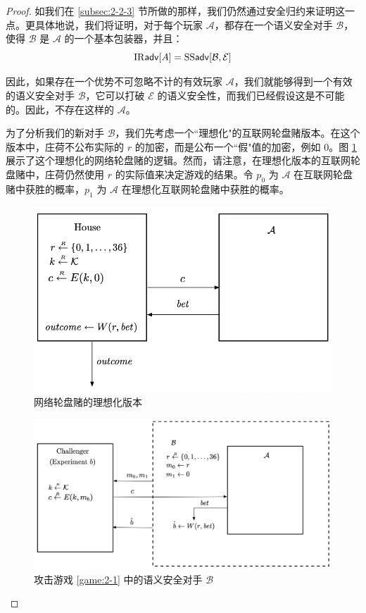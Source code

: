 \begin{proof}
如我们在 \ref{subsec:2-2-3} 节所做的那样，我们仍然通过安全归约来证明这一点。更具体地说，我们将证明，对于每个玩家 $\mathcal{A}$，都存在一个语义安全对手 $\mathcal{B}$，使得 $\mathcal{B}$ 是 $\mathcal{A}$ 的一个基本包装器，并且：
\begin{equation}\label{eq:2-7}
{\rm IR\mathsf{adv}}[A]={\rm SS\mathsf{adv}}[\mathcal{B},\mathcal{E}]
\end{equation}

因此，如果存在一个优势不可忽略不计的有效玩家 $\mathcal{A}$，我们就能够得到一个有效的语义安全对手 $\mathcal{B}$，它可以打破 $\mathcal{E}$ 的语义安全性，而我们已经假设这是不可能的。因此，不存在这样的 $\mathcal{A}$。

为了分析我们的新对手 $\mathcal{B}$，我们先考虑一个``理想化"的互联网轮盘赌版本。在这个版本中，庄荷不公布实际的 $r$ 的加密，而是公布一个``假"值的加密，例如 $0$。图 \ref{fig:2-3} 展示了这个理想化的网络轮盘赌的逻辑。然而，请注意，在理想化版本的互联网轮盘赌中，庄荷仍然使用 $r$ 的实际值来决定游戏的结果。令 $p_0$ 为 $\mathcal{A}$ 在互联网轮盘赌中获胜的概率，$p_1$ 为 $\mathcal{A}$ 在理想化互联网轮盘赌中获胜的概率。

\begin{figure}
  \centering
  \includegraphics[width=0.6\linewidth]{figures/chapter2/fig3.png}
  \caption{网络轮盘赌的理想化版本}
  \label{fig:2-3}
\end{figure}

\begin{figure}
  \centering
  \includegraphics[width=0.85\linewidth]{figures/chapter2/fig4.png}
  \caption{攻击游戏 \ref{game:2-1} 中的语义安全对手 $\mathcal{B}$}
  \label{fig:2-4}
\end{figure}


\end{proof}
